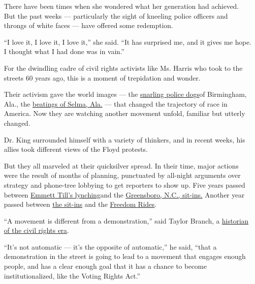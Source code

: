 There have been times when she wondered what her generation had
achieved. But the past weeks --- particularly the sight of kneeling
police officers and throngs of white faces --- have offered some
redemption.

``I love it, I love it, I love it,'' she said. ``It has surprised me,
and it gives me hope. I thought what I had done was in vain.''

For the dwindling cadre of civil rights activists like Ms. Harris who
took to the streets 60 years ago, this is a moment of trepidation and
wonder.

Their activism gave the world images --- the
\href{https://www.nytimes.com/2013/01/21/opinion/good-and-evil-in-birmingham.html?searchResultPosition=4}{snarling
police dogs}of Birmingham, Ala., the
\href{https://www.nytimes.com/video/multimedia/100000003555951/for-selma-marcher-memories-of-chaos-still-fresh-50-years-on.html?searchResultPosition=6}{beatings
of Selma, Ala.} --- that changed the trajectory of race in America. Now
they are watching another movement unfold, familiar but utterly changed.

Dr. King surrounded himself with a variety of thinkers, and in recent
weeks, his allies took different views of the Floyd protests.

But they all marveled at their quicksilver spread. In their time, major
actions were the result of months of planning, punctuated by all-night
arguments over strategy and phone-tree lobbying to get reporters to show
up. Five years passed between
\href{https://www.nytimes.com/2019/02/21/us/remembering-emmett-till-legacy-virtual-reality.html}{Emmett
Till's lynching}and the
\href{https://learning.blogs.nytimes.com/2012/02/01/feb-1-1960-black-students-and-the-greensboro-sit-in/?searchResultPosition=2}{Greensboro,
N.C., sit-ins.} Another year passed between
\href{http://www.library.ncat.edu/resources/archives/four.html\#section-4}{the
sit-ins} and the
\href{https://www.nytimes.com/2011/05/20/opinion/20Lafayette.html}{Freedom
Rides}.

``A movement is different from a demonstration,'' said Taylor Branch, a
\href{https://www.nytimes.com/2006/02/05/books/review/the-whirlwinds-of-revolt.html}{historian
of the civil rights era}.

``It's not automatic --- it's the opposite of automatic,'' he said,
``that a demonstration in the street is going to lead to a movement that
engages enough people, and has a clear enough goal that it has a chance
to become institutionalized, like the Voting Rights Act.''

